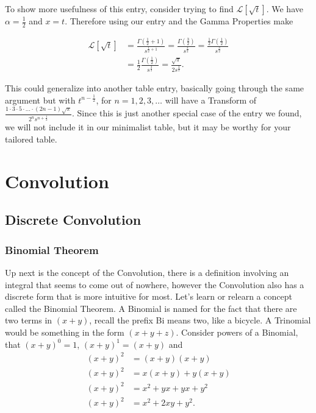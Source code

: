 \documentclass[12pt]{article}
\newcommand{\lp}{\mathscr{L}}
\begin{document}
To show more usefulness of this entry, consider trying to find $\lp[\sqrt{t}]$. We have $\alpha=\frac{1}{2}$ and $x=t$. Therefore using our entry and the Gamma Properties make

\begin{align*}
    \lp[\sqrt{t}]&=\frac{\Gamma\left(\frac{1}{2}+1\right)}{s^{\frac{1}{2}+1}} =\frac{\Gamma\left(\frac{3}{2}\right)}{s^{\frac{3}{2}}}= \frac{\frac{1}{2}\Gamma\left(\frac{1}{2}\right)}{s^{\frac{3}{2}}} \\
    &= \frac{1}{2}\frac{\Gamma\left(\frac{1}{2}\right)}{s^{\frac{3}{2}}} =\frac{\sqrt{\pi}}{2s^{\frac{3}{2}}}.
\end{align*}

This could generalize into another table entry, basically going through the same argument but with $t^{n-\frac{1}{2}}$, for $n=1,2,3,\ldots$ will have a Transform of $\frac{1\cdot3\cdot5\cdot \ldots \cdot (2n-1)\sqrt{\pi}}{2^n s^{n+\frac{1}{2}}}$. Since this is just another special case of the entry we found, we will not include it in our minimalist table, but it may be worthy for your tailored table.

\section{Convolution}

\subsection{Discrete Convolution}

\subsubsection{Binomial Theorem}

Up next is the concept of the Convolution, there is a definition involving an integral that seems to come out of nowhere, however the Convolution also has a discrete form that is more intuitive for most. Let's learn or relearn a concept called the Binomial Theorem. A Binomial is named for the fact that there are two terms in $(x+y)$, recall the prefix Bi means two, like a bicycle. A Trinomial would be something in the form $(x+y+z)$. Consider powers of a Binomial, that $(x+y)^0=1$, $(x+y)^1=(x+y)$ and
\begin{align*}
    (x+y)^2 &= (x+y)(x+y) \\
    (x+y)^2 &= x(x+y)+y(x+y) \\
    (x+y)^2 &= x^2+yx+yx+y^2 \\
    (x+y)^2 &= x^2+2xy+y^2.
\end{align*}
\end{document}
